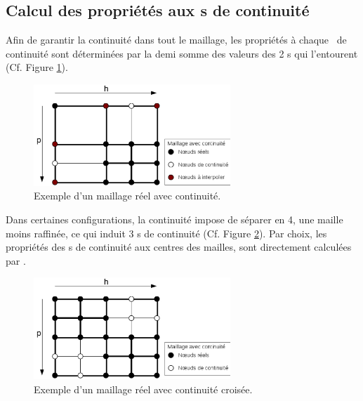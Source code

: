        \subsection{Calcul des propriétés aux \n s de continuité }
       Afin de garantir la continuité dans tout le maillage,
       les propriétés à chaque \n\ de continuité sont déterminées par la demi somme des valeurs des 2 \n s qui l'entourent (Cf. Figure \ref{1cont}).
       \begin{figure}[H]
	\center
	\includegraphics[width=0.66\textwidth]{schema_2d_ct.eps}
	\caption{Exemple d'un maillage réel avec continuité.}\label{1cont}
       \end{figure}
       Dans certaines configurations, la continuité impose de séparer en 4, une maille moins raffinée,
       ce qui induit 3 \n s de continuité (Cf. Figure \ref{2cont}).
       Par choix, les propriétés des \n s de continuité aux centres des mailles, sont directement calculées par \EOS.
       \begin{figure}[H]
	\center
	\includegraphics[width=0.66\textwidth]{schema_2d_2ct.eps}
	\caption{Exemple d'un maillage réel avec continuité croisée.}\label{2cont}
       \end{figure}
     
      
  
   \clearpage    
 
      

\clearpage

